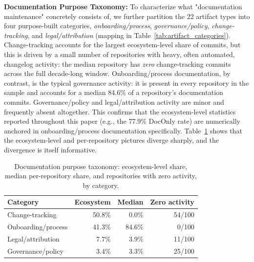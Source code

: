 \documentclass[10pt,conference]{IEEEtran}
\newcommand{\MGuizani}[1]{\textcolor{blue}{{\bfseries [[#1]]}}}
\begin{document}
{{\textbf{Documentation Purpose Taxonomy:}
To characterize what "documentation maintenance" concretely consists of, we further partition the 22 artifact types into four purpose-built categories, \textit{onboarding/process}, \textit{governance/policy}, \textit{change-tracking}, and \textit{legal/attribution} (mapping in Table~\ref{tab:artifact_categories}). Change-tracking accounts for the largest ecosystem-level share of commits, but this is driven by a small number of repositories with heavy, often automated, changelog activity: the median repository has \textit{zero} change-tracking commits across the full decade-long window. Onboarding/process documentation, by contrast, is the typical governance activity: it is present in every repository in the sample and accounts for a median 84.6\% of a repository's documentation commits. Governance/policy and legal/attribution activity are minor and frequently absent altogether. This confirms that the ecosystem-level statistics reported throughout this paper (e.g., the 77.9\% DocOnly rate) are numerically anchored in onboarding/process documentation specifically. Table~\ref{tab:artifact_taxonomy} shows that the ecosystem-level and per-repository pictures diverge sharply, and the divergence is itself informative.
\vspace{-10pt}
\begin{table}[h]
\centering
\small
\caption{Documentation purpose taxonomy: ecosystem-level share, median per-repository share, and repositories with zero activity, by category.}
\label{tab:artifact_taxonomy}
\setlength{\tabcolsep}{4pt}
\renewcommand{\arraystretch}{1.2}
\begin{tabular}{lrrr}
\toprule
\textbf{Category} & \textbf{Ecosystem} & \textbf{Median} & \textbf{Zero activity} \\
\midrule
Change-tracking     & 50.8\% & 0.0\%  & 54/100 \\
Onboarding/process  & 41.3\% & 84.6\% & 0/100 \\
Legal/attribution   & 7.7\%  & 3.9\%  & 11/100 \\
Governance/policy   & 3.4\%  & 3.3\%  & 25/100 \\
\bottomrule
\end{tabular}
\end{table}


\begin{tcolorbox}[
  colback=heatmaplight,
  colframe=heatmapdark,
  coltitle=white,
  fonttitle=\bfseries,
  title=Summary — RQ1
]


\end{tcolorbox}}}
\end{document}

